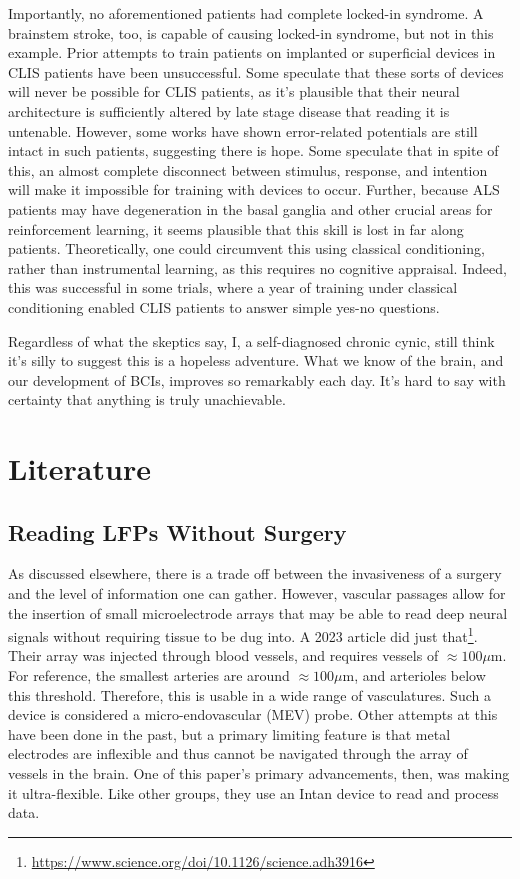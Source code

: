 Importantly, no aforementioned patients had complete locked-in syndrome. A brainstem stroke, too, is capable of causing locked-in syndrome, but not in this example. Prior attempts to train patients on implanted or superficial devices in CLIS patients have been unsuccessful. Some speculate that these sorts of devices will never be possible for CLIS patients, as it's plausible that their neural architecture is sufficiently altered by late stage disease that reading it is untenable. However, some works have shown error-related potentials are still intact in such patients, suggesting there is hope. Some speculate that in spite of this, an almost complete disconnect between stimulus, response, and intention will make it impossible for training with devices to occur. Further, because ALS patients may have degeneration in the basal ganglia and other crucial areas for reinforcement learning, it seems plausible that this skill is lost in far along patients. Theoretically, one could circumvent this using classical conditioning, rather than instrumental learning, as this requires no cognitive appraisal. Indeed, this was successful in some trials, where a year of training under classical conditioning enabled CLIS patients to answer simple yes-no questions. \newline

Regardless of what the skeptics say, I, a self-diagnosed chronic cynic, still think it's silly to suggest this is a hopeless adventure. What we know of the brain, and our development of BCIs, improves so remarkably each day. It's hard to say with certainty that anything is truly unachievable.  

\section{Literature}

\subsection{Reading LFPs Without Surgery}

As discussed elsewhere, there is a trade off between the invasiveness of a surgery and the level of information one can gather. However, vascular passages allow for the insertion of small microelectrode arrays that may be able to read deep neural signals without requiring tissue to be dug into. A 2023 article did just that\footnote{\url{https://www.science.org/doi/10.1126/science.adh3916}}. Their array was injected through blood vessels, and requires vessels of $\approx 100 \mu$m. For reference, the smallest arteries are around $\approx 100 \mu$m, and arterioles below this threshold. Therefore, this is usable in a wide range of vasculatures. Such a device is considered a micro-endovascular (MEV) probe. Other attempts at this have been done in the past, but a primary limiting feature is that metal electrodes are inflexible and thus cannot be navigated through the array of vessels in the brain. One of this paper's primary advancements, then, was making it ultra-flexible. Like other groups, they use an Intan device to read and process data.\newline

